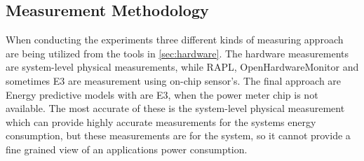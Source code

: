 \subsection{Measurement Methodology}
When conducting the experiments three different kinds of measuring approach are being utilized from the tools in \cref{sec:hardware}.
The hardware measurements are system-level physical measurements, while RAPL, OpenHardwareMonitor and sometimes E3 are measurement using on-chip sensor's. The final approach are Energy predictive models with are E3, when the power meter chip is not available. The most accurate of these is the system-level physical measurement which can provide highly accurate measurements for the systems energy consumption, but these measurements are for the system, so it cannot provide a fine grained view of an applications power consumption. 
